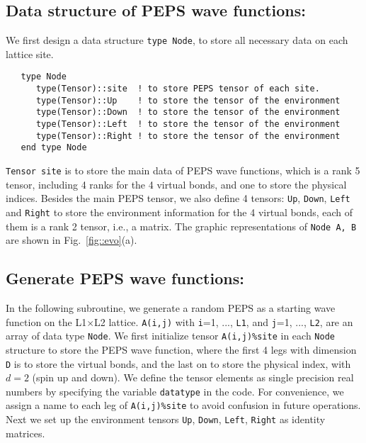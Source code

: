 \documentclass[preprint,3p,times,preprint,showpacs,amsmath,superscriptaddress,floatfix]{elsarticle}
\begin{document}
\subsection{Data structure of PEPS wave functions: }
We first design a data structure {\tt type Node}, to store all necessary data on each lattice site.
%
\begin{verbatim}
   type Node
      type(Tensor)::site  ! to store PEPS tensor of each site.
      type(Tensor)::Up    ! to store the tensor of the environment
      type(Tensor)::Down  ! to store the tensor of the environment
      type(Tensor)::Left  ! to store the tensor of the environment
      type(Tensor)::Right ! to store the tensor of the environment
   end type Node
\end{verbatim}
%
{\tt Tensor site} is to store the main data
of PEPS wave functions, which is a rank 5 tensor, including 4 ranks for the 4 virtual bonds, and one to store the physical indices.
Besides the main PEPS tensor, we also define 4 tensors: {\tt Up}, {\tt Down}, {\tt Left} and {\tt Right}
to store the environment information for the 4 virtual bonds, each of them is a rank 2 tensor, i.e., a matrix.
The graphic representations of {\tt Node A, B}  are shown in Fig.~\ref{fig::evo}(a).


	

\subsection{Generate PEPS wave functions: }

In the following subroutine, we generate a random PEPS as a starting wave function on the L1$\times$L2 lattice.
{\tt A(i,j)} with {\tt i}=1, ..., {\tt L1}, and {\tt j}=1, ..., {\tt L2}, are an array of data type {\tt Node}.
We first initialize tensor {\tt A(i,j)\%site} in each {\tt Node} structure to store the PEPS wave function,
where the first 4 legs with dimension {\tt D} is to store the virtual bonds, and the
last on to store the physical index, with $d=2$ (spin up and down). We define the tensor elements as single precision real numbers by specifying the variable {\tt datatype} in the code.
For convenience, we assign a name to each leg of {\tt A(i,j)\%site} to avoid confusion in future operations.
Next we set up the environment tensors {\tt Up}, {\tt Down}, {\tt Left}, {\tt Right} as identity matrices.
\end{document}
